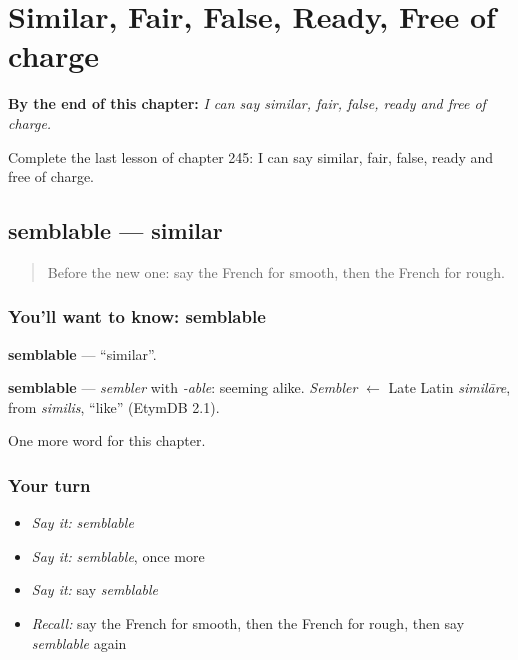 
\chapter{Similar, Fair, False, Ready, Free of charge}
\label{ch:fr-similar-fair-false-ready-free-of-charge}

\begin{chapteropening}
\textbf{By the end of this chapter:} \emph{I can say similar, fair, false, ready and free of charge.}

Complete the last lesson of chapter 245: I can say similar, fair, false, ready and free of charge.
\end{chapteropening}

\section[semblable]{semblable — similar}

\label{lesson:FR-C245-semblable}



\begin{quote}
Before the new one: say the French for smooth, then the French for rough.
\end{quote}

\subsection*{You'll want to know: semblable}
\textbf{semblable} — \textquotedblleft{}similar\textquotedblright{}.

\begin{cousinweb}
\textbf{semblable} — \emph{sembler} with \emph{-able}: seeming alike. \emph{Sembler} $\leftarrow$ Late Latin \emph{similāre}, from \emph{similis}, \textquotedblleft{}like\textquotedblright{} (EtymDB 2.1).
\end{cousinweb}

\begin{grammarlens}[title={What you've built}]
One more word for this chapter.
\end{grammarlens}

\subsection*{Your turn}
\begin{itemize}
\raggedright
  \item \emph{Say it:} \emph{semblable}
  \item \emph{Say it:} \emph{semblable}, once more
  \item \emph{Say it:} say \emph{semblable}
  \item \emph{Recall:} say the French for smooth, then the French for rough, then say \emph{semblable} again
\end{itemize}

